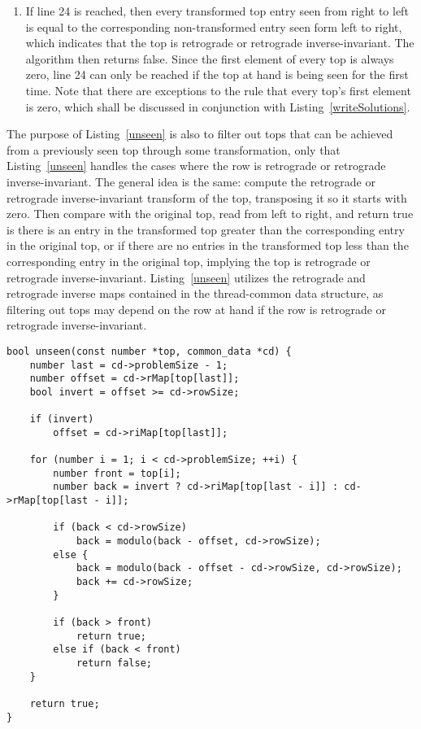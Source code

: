 \begin{enumerate}
\addtocounter{enumi}{3}
\item If line 24 is reached, then every transformed top entry seen from right to left is equal to the corresponding non-transformed entry seen form left to right, which indicates that the top is retrograde or retrograde inverse-invariant. The algorithm then returns false. Since the first element of every top is always zero, line 24 can only be reached if the top at hand is being seen for the first time. Note that there are exceptions to the rule that every top's first element is zero, which shall be discussed in conjunction with Listing~\ref{writeSolutions}.
\end{enumerate}

The purpose of Listing~\ref{unseen} is also to filter out tops that can be achieved from a previously seen top through some transformation, only that Listing~\ref{unseen} handles the cases where the row is retrograde or retrograde inverse-invariant. The general idea is the same: compute the retrograde or retrograde inverse-invariant transform of the top, transposing it so it starts with zero. Then compare with the original top, read from left to right, and return true is there is an entry in the transformed top greater than the corresponding entry in the original top, or if there are no entries in the transformed top less than the corresponding entry in the original top, implying the top is retrograde or retrograde inverse-invariant. Listing~\ref{unseen} utilizes the retrograde and retrograde inverse maps contained in the thread-common data structure, as filtering out tops may depend on the row at hand if the row is retrograde or retrograde inverse-invariant.

\begin{lstlisting}[caption={Determining whether a top has not yet been seen for retrograde or retrograde inverse-invariant rows.},label={unseen}]
bool unseen(const number *top, common_data *cd) {
    number last = cd->problemSize - 1;
    number offset = cd->rMap[top[last]];
    bool invert = offset >= cd->rowSize;

    if (invert)
        offset = cd->riMap[top[last]];

    for (number i = 1; i < cd->problemSize; ++i) {
        number front = top[i];
        number back = invert ? cd->riMap[top[last - i]] : cd->rMap[top[last - i]];

        if (back < cd->rowSize)
            back = modulo(back - offset, cd->rowSize);
        else {
            back = modulo(back - offset - cd->rowSize, cd->rowSize);
            back += cd->rowSize;
        }

        if (back > front)
            return true;
        else if (back < front)
            return false;
    }

    return true;
}
\end{lstlisting}

